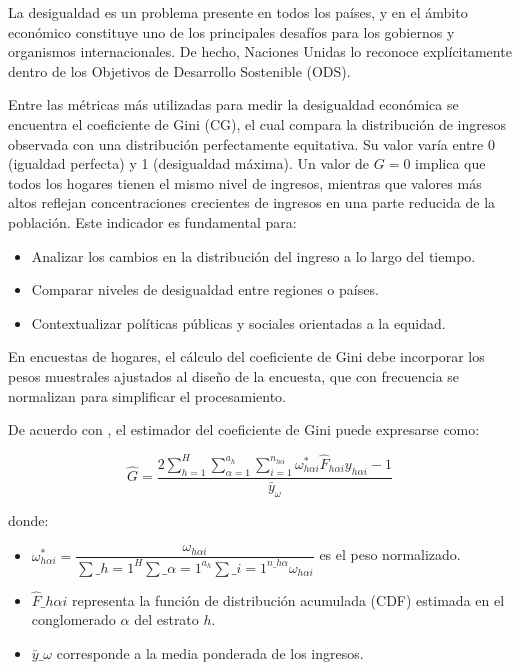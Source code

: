 \documentclass[
  spanish,
  12pt,
]{book}
\providecommand{\tightlist}{%
  \setlength{\itemsep}{0pt}\setlength{\parskip}{0pt}}
\begin{document}
La desigualdad es un problema presente en todos los países, y en el ámbito económico constituye uno de los principales desafíos para los gobiernos y organismos internacionales. De hecho, Naciones Unidas lo reconoce explícitamente dentro de los Objetivos de Desarrollo Sostenible (ODS).

Entre las métricas más utilizadas para medir la desigualdad económica se encuentra el coeficiente de Gini (CG), el cual compara la distribución de ingresos observada con una distribución perfectamente equitativa. Su valor varía entre 0 (igualdad perfecta) y 1 (desigualdad máxima). Un valor de \(G = 0\) implica que todos los hogares tienen el mismo nivel de ingresos, mientras que valores más altos reflejan concentraciones crecientes de ingresos en una parte reducida de la población. Este indicador es fundamental para:

\begin{itemize}
\tightlist
\item
  Analizar los cambios en la distribución del ingreso a lo largo del tiempo.
\item
  Comparar niveles de desigualdad entre regiones o países.
\item
  Contextualizar políticas públicas y sociales orientadas a la equidad.
\end{itemize}

En encuestas de hogares, el cálculo del coeficiente de Gini debe incorporar los pesos muestrales ajustados al diseño de la encuesta, que con frecuencia se normalizan para simplificar el procesamiento.

De acuerdo con \citet{binder1995}, el estimador del coeficiente de Gini puede expresarse como:

\[
\hat{G} = \frac{2\sum_{h=1}^{H}\sum_{\alpha=1}^{a_{h}}\sum_{i=1}^{n_{h\alpha}}\omega_{h\alpha i}^{*}\hat{F}_{h\alpha i}y_{h\alpha i}-1}{\bar{y}_{\omega}}
\]

donde:

\begin{itemize}
\tightlist
\item
  \(\omega_{h\alpha i}^{*}=\dfrac{\omega_{h\alpha i}}{\sum\_{h=1}^{H}\sum\_{\alpha=1}^{a_{h}}\sum\_{i=1}^{n\_{h\alpha}}\omega_{h\alpha i}}\) es el peso normalizado.
\item
  \(\hat{F}\_{h\alpha i}\) representa la función de distribución acumulada (CDF) estimada en el conglomerado \(\alpha\) del estrato \(h\).
\item
  \(\bar{y}\_{\omega}\) corresponde a la media ponderada de los ingresos.
\end{itemize}
\end{document}
